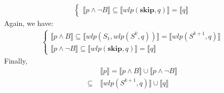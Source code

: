 \documentclass[11pt]{article}
\begin{document}
\begin{enumerate}
\begin{enumerate}
\begin{itemize}
\begin{align*}
\begin{cases}
							\llbracket p \land \neg B \rrbracket \subseteq \llbracket wlp(\textbf{skip}, q) \rrbracket = \llbracket q \rrbracket
						\end{cases}
					\end{align*}
					Again, we have:
					\begin{align*}
						\begin{cases}
							\llbracket p \land B \rrbracket \subseteq \llbracket wlp(S_{1}, wlp(S^{k}, q)) \rrbracket = \llbracket wlp(S^{k+1}, q) \rrbracket\\
							\llbracket p \land \neg B \rrbracket \subseteq \llbracket wlp(\textbf{skip}, q) \rrbracket = \llbracket q \rrbracket
						\end{cases}
					\end{align*}
					Finally, 
					\begin{align*}
						& \llbracket p \rrbracket = \llbracket p \land B \rrbracket \cup \llbracket p \land \neg B \rrbracket\\
						\subseteq ~& \llbracket wlp(S^{k+1}, q) \rrbracket \cup \llbracket q \rrbracket
					\end{align*}
			\end{itemize}



\end{enumerate}
\end{enumerate}
\end{document}
